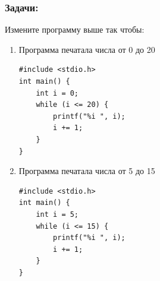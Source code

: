 \documentclass{article}
\begin{document}
\subsubsection*{Задачи:}
Измените программу выше так чтобы:
\begin{enumerate}
\item Программа печатала числа от 0 до 20
\begin{lstlisting}[backgroundcolor = \color{solcolor}]
#include <stdio.h>
int main() {
    int i = 0;
    while (i <= 20) {
        printf("%i ", i);
        i += 1;
    }
}
\end{lstlisting}
\item Программа печатала числа от 5 до 15
\begin{lstlisting}[backgroundcolor = \color{solcolor}]
#include <stdio.h>
int main() {
    int i = 5;
    while (i <= 15) {
        printf("%i ", i);
        i += 1;
    }
}
\end{lstlisting}


\end{enumerate}
\end{document}
